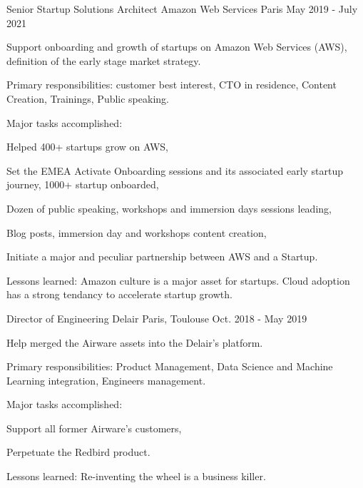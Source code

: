 \begin{cventries}
  \cventry
    {Senior Startup Solutions Architect} %
    {Amazon Web Services} %
    {Paris} %
    {May 2019 - July 2021} %
    {
      \begin{cvitems} %
        \item {Support onboarding and growth of startups on Amazon Web Services (AWS), definition of the early stage market strategy.}
        \item {Primary responsibilities: customer best interest, CTO in residence, Content Creation, Trainings, Public speaking.}
        \item {Major tasks accomplished:}
        \begin{cvsubitems}
          \item {Helped 400+ startups grow on AWS,}
          \item {Set the EMEA Activate Onboarding sessions and its associated early startup journey, 1000+ startup onboarded,}
          \item {Dozen of public speaking, workshops and immersion days sessions leading,}
          \item {Blog posts, immersion day and workshops content creation,}
          \item {Initiate a major and peculiar partnership between AWS and a Startup.}
        \end{cvsubitems}
        \item {Lessons learned: Amazon culture is a major asset for startups. Cloud adoption has a strong tendancy to accelerate startup growth.}
      \end{cvitems}
    }

  \cventry
    {Director of Engineering} %
    {Delair} %
    {Paris, Toulouse} %
    {Oct. 2018 - May 2019} %
    {
      \begin{cvitems} %
        \item {Help merged the Airware assets into the Delair's platform.}
        \item {Primary responsibilities: Product Management, Data Science and Machine Learning integration, Engineers management.}
        \item {Major tasks accomplished:}
        \begin{cvsubitems}
          \item {Support all former Airware's customers,}
          \item {Perpetuate the Redbird product.}
        \end{cvsubitems}
        \item {Lessons learned: Re-inventing the wheel is a business killer.}
      \end{cvitems}
    }


\end{cventries}
